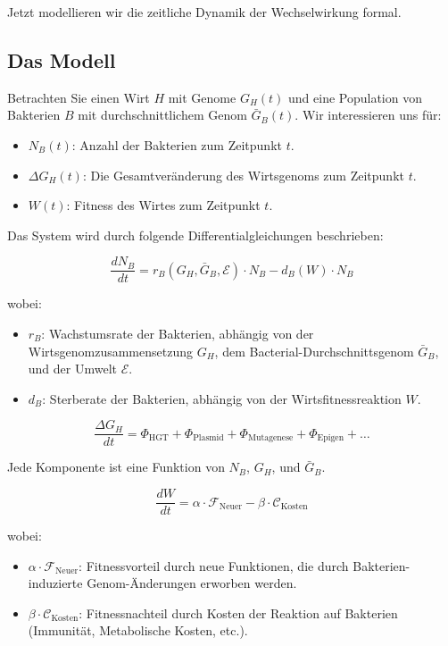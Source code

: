 \documentclass[a4paper,12pt]{article}
\theoremstyle{definition}
\begin{document}

Jetzt modellieren wir die zeitliche Dynamik der Wechselwirkung formal.

\subsection{Das Modell}

Betrachten Sie einen Wirt $H$ mit Genome $G_H(t)$ und eine Population von Bakterien $B$ mit durchschnittlichem Genom $\bar{G}_B(t)$. Wir interessieren uns für:
\begin{itemize}
    \item[-] $N_B(t)$: Anzahl der Bakterien zum Zeitpunkt $t$.
    \item[-] $\Delta G_H(t)$: Die Gesamtveränderung des Wirtsgenoms zum Zeitpunkt $t$.
    \item[-] $W(t)$: Fitness des Wirtes zum Zeitpunkt $t$.
\end{itemize}

Das System wird durch folgende Differentialgleichungen beschrieben:

\[
\frac{dN_B}{dt} = r_B(G_H, \bar{G}_B, \mathcal{E}) \cdot N_B - d_B(W) \cdot N_B
\]

wobei:
\begin{itemize}
    \item[-] $r_B$: Wachstumsrate der Bakterien, abhängig von der Wirtsgenomzusammensetzung $G_H$, dem Bacterial-Durchschnittsgenom $\bar{G}_B$, und der Umwelt $\mathcal{E}$.
    \item[-] $d_B$: Sterberate der Bakterien, abhängig von der Wirtsfitnessreaktion $W$.
\end{itemize}

\[
\frac{\Delta G_H}{dt} = \Phi_{\text{HGT}} + \Phi_{\text{Plasmid}} + \Phi_{\text{Mutagenese}} + \Phi_{\text{Epigen}} + \ldots
\]

Jede Komponente ist eine Funktion von $N_B$, $G_H$, und $\bar{G}_B$.

\[
\frac{dW}{dt} = \alpha \cdot \mathcal{F}_{\text{Neuer}} - \beta \cdot \mathcal{C}_{\text{Kosten}}
\]

wobei:
\begin{itemize}
    \item[-] $\alpha \cdot \mathcal{F}_{\text{Neuer}}$: Fitnessvorteil durch neue Funktionen, die durch Bakterien-induzierte Genom-Änderungen erworben werden.
    \item[-] $\beta \cdot \mathcal{C}_{\text{Kosten}}$: Fitnessnachteil durch Kosten der Reaktion auf Bakterien (Immunität, Metabolische Kosten, etc.).
\end{itemize}
\end{document}
